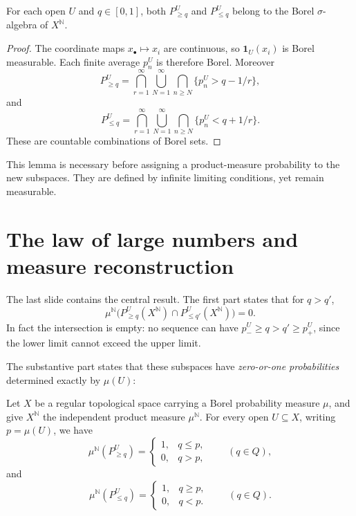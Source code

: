 \begin{lemma}
For each open \(U\) and \(q\in[0,1]\), both \(P_{\geq q}^U\) and \(P_{\leq q}^U\) belong to the Borel \(\sigma\)-algebra of \(X^{\mathbb N}\).
\end{lemma}
\begin{proof}
The coordinate maps \(x_\bullet\mapsto x_i\) are continuous, so \(\mathbf1_U(x_i)\) is Borel measurable. Each finite average \(p_n^U\) is therefore Borel. Moreover
\[
 P_{\geq q}^U
 =\bigcap_{r=1}^{\infty}
   \bigcup_{N=1}^{\infty}
   \bigcap_{n\geq N}\{p_n^U>q-1/r\},
\]
and
\[
 P_{\leq q}^U
 =\bigcap_{r=1}^{\infty}
   \bigcup_{N=1}^{\infty}
   \bigcap_{n\geq N}\{p_n^U<q+1/r\}.
\]
These are countable combinations of Borel sets.
\end{proof}

This lemma is necessary before assigning a product-measure probability to the new subspaces. They are defined by infinite limiting conditions, yet remain measurable.

\section{The law of large numbers and measure reconstruction}

The last slide contains the central result. The first part states that for \(q>q'\),
\begin{equation}
 \mu^{\mathbb N}\bigl(
 P_{\geq q}^U(X^{\mathbb N})
 \cap P_{\leq q'}^U(X^{\mathbb N})\bigr)=0.
 \label{eq:N20261026-incompatible-thresholds}
\end{equation}
In fact the intersection is empty: no sequence can have
\(p_-^U\geq q>q'\geq p_+^U\), since the lower limit cannot exceed the upper limit.

The substantive part states that these subspaces have \emph{zero-or-one probabilities} determined exactly by \(\mu(U)\):
\begin{theorem}
Let \(X\) be a regular topological space carrying a Borel probability measure \(\mu\), and give \(X^{\mathbb N}\) the independent product measure \(\mu^{\mathbb N}\). For every open \(U\subseteq X\), writing \(p=\mu(U)\), we have
\begin{equation}
 \mu^{\mathbb N}(P_{\geq q}^U)=
 \begin{cases}1,&q\leq p,\\0,&q>p,\end{cases}
 \qquad(q\in Q),
 \label{eq:N20261026-LLN-ge}
\end{equation}
and
\begin{equation}
 \mu^{\mathbb N}(P_{\leq q}^U)=
 \begin{cases}1,&q\geq p,\\0,&q<p.\end{cases}
 \qquad(q\in Q).
 \label{eq:N20261026-LLN-le}
\end{equation}
\end{theorem}

